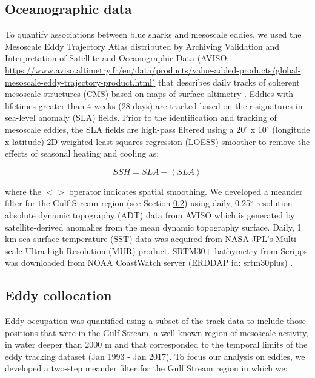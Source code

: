 \subsection{Oceanographic data}

To quantify associations between blue sharks and mesoscale eddies, we used the Mesoscale Eddy Trajectory Atlas distributed by Archiving Validation and Interpretation of Satellite and Oceanographic Data (AVISO; \href{https://www.aviso.altimetry.fr/en/data/products/value-added-products/global-mesoscale-eddy-trajectory-product.html}{https://www.aviso.altimetry.fr/en/data/products/value-added-products/global-mesoscale-eddy-trajectory-product.html)} that describes daily tracks of coherent mesoscale structures (CMS) based on maps of surface altimetry \citep{Chelton2011}. Eddies with lifetimes greater than 4 weeks (28 days) are tracked based on their signatures in sea-level anomaly (SLA) fields. Prior to the identification and tracking of mesoscale eddies, the SLA fields are high-pass filtered using a 20$^\circ$ x 10$^\circ$ (longitude x latitude) 2D weighted least-squares regression (LOESS) smoother to remove the effects of seasonal heating and cooling \citep{Chelton2011} as:

\begin{equation}
SSH = SLA - \left<SLA\right>
\label{eq:ssh}
\end{equation}

where the $<>$ operator indicates spatial smoothing. We developed a meander filter for the Gulf Stream region (see Section \ref{sec:eddycoll}) using daily, 0.25$^\circ$ resolution absolute dynamic topography (ADT) data from AVISO which is generated by satellite-derived anomalies from the \citet{Rio2011} mean dynamic topography surface. Daily, 1 km sea surface temperature (SST) data was acquired from NASA JPL's Multi-scale Ultra-high Resolution (MUR) product. SRTM30+ bathymetry from Scripps was downloaded from NOAA CoastWatch server (ERDDAP id: srtm30plus) \citep{Becker2009}.

\subsection{Eddy collocation} \label{sec:eddycoll}

Eddy occupation was quantified using a subset of the track data to include those positions that were in the Gulf Stream, a well-known region of mesoscale activity, in water deeper than 2000 m and that corresponded to the temporal limits of the eddy tracking dataset (Jan 1993 - Jan 2017). To focus our analysis on eddies, we developed a two-step meander filter \citep[similar to ][]{Gaube2017DSR} for the Gulf Stream region in which we: 

